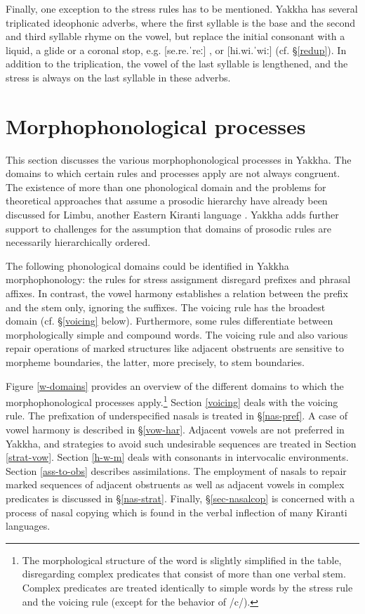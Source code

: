 Finally, one exception to the stress rules has to be mentioned. Yakkha has several triplicated ideophonic adverbs, where the first syllable is the base and the second and third syllable rhyme on the vowel, but replace the initial consonant with a liquid, a glide or a coronal stop, e.g. [se.re.ˈreː] , or [hi.wi.ˈwiː]  (cf. §\ref{redup}). In addition to the triplication, the vowel of the last syllable is lengthened, and the stress is always on the last syllable in these adverbs.


\section{Morphophonological processes}\label{morphophon}



This section discusses the various morphophonological processes in Yakkha. The domains to which certain rules and processes apply are not always congruent. The existence of more than one phonological domain and the problems for theoretical approaches that assume a prosodic hierarchy have already been discussed for Limbu, another Eastern Kiranti language  \citep{Hildebrandt2007Prosodic, Schieringetal2010The-prosodic}. Yakkha adds further support to challenges for the assumption that domains of prosodic rules are necessarily hierarchically ordered. 

The following phonological domains could be identified in Yakkha morpho\-pho\-no\-logy: the rules for stress assignment disregard prefixes and phrasal affixes. In contrast, the vowel harmony establishes a relation between the prefix and the stem only, ignoring the suffixes. The voicing rule has the broadest domain (cf. §\ref{voicing} below). Furthermore, some rules differentiate between morphologically simple and compound words. The voicing rule and also various repair operations of marked structures like adjacent obstruents are sensitive to morpheme boundaries, the latter, more precisely,  to stem boundaries. 

Figure  \ref{w-domains} provides an overview of the different domains to which the morphophonological processes apply.\footnote{The morphological structure of the word is slightly simplified in the table, disregarding complex predicates that consist of more than one verbal stem. Complex predicates are treated identically to simple words by the stress rule and the voicing rule (except for the behavior of /c/).} Section \ref{voicing} deals with  the voicing rule. The prefixation of underspecified nasals is treated in §\ref{nas-pref}. A case of vowel harmony is described in §\ref{vow-har}. Adjacent vowels are not preferred in Yakkha, and strategies to avoid such undesirable sequences are treated in Section \ref{strat-vow}. Section \ref{h-w-m} deals with consonants in intervocalic environments. Section \ref{ass-to-obs} describes assimilations. The employment of nasals to repair marked sequences of adjacent obstruents as well as adjacent vowels in complex predicates is discussed in §\ref{nas-strat}. Finally, §\ref{sec-nasalcop} is concerned with a process of nasal copying which is found in the verbal inflection of many Kiranti languages.



